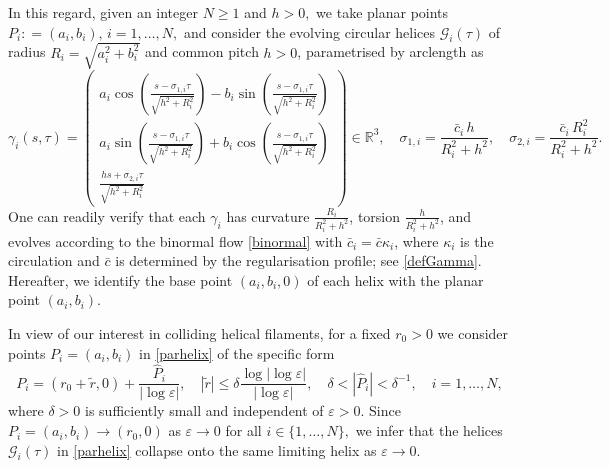 \documentclass[11pt,reqno,a4paper]{amsart}
\numberwithin{equation}{section}
\newcommand{\R}{\mathbb{R}}
\newcommand{\defeq}{\mathrel{\mathop:}=}
\newcommand{\ve}{\varepsilon}
\begin{document}
In this regard, given an integer $N\geq 1$ and $h>0,$ we take planar points $P_i\defeq(a_i,b_i),\,i=1,\dots,N,$ and consider the evolving circular helices  $\mathcal{G}_i(\tau)$ of radius $R_i=\sqrt{a_i^2+b_i^2}$ and common pitch $h>0$, parametrised by arclength as 
\begin{equation} \label{parhelix}
	\gamma_i(s,\tau ) = \left( \begin{matrix}
		a_i \cos \left(
		\frac{s-\sigma_{1,i} \tau}{\sqrt{h^2 + R_i^2}}\right)-b_i\sin \left(\frac{s-\sigma_{1,i}\tau}{\sqrt{h^2+R_i^2}} \right)
		\\
		a_i \sin \left(
		\frac{s-\sigma_{1,i} \tau}{\sqrt{h^2 + R_i^2}}\right)+b_i\cos \left(
		\frac{s-\sigma_{1,i} \tau}{\sqrt{h^2 + R_i^2}}\right)
		\\
		\frac{ h s + \sigma_{2,i} \tau }{\sqrt{h^2+ R_i^2}}
	\end{matrix} \right) \in \R^3, \quad \sigma_{1,i} = \frac{\bar{c}_i\,  h}{R_i^2 + h^2},
	\quad 
	\sigma_{2,i} = \frac{ \bar{c}_i\, R_i^2}{R_i^2 + h^2}.
	\end{equation}
One can readily verify that each $\gamma_i$ has curvature $\frac{R_i}{R_i^2+h^2}$, torsion $\frac{h}{R_i^2 + h^2}$, and evolves according to the binormal flow \eqref{binormal} with $\bar{c}_i=\bar{c}\kappa_i$, where $\kappa_i$ is the circulation and $\bar{c}$ is determined by the regularisation profile; see \eqref{defGamma}. Hereafter, we identify the base point  $(a_i,b_i,0)$ of each helix with the planar point $(a_i,b_i)$.

In view of our interest in  colliding helical filaments, for a fixed $r_0>0$ we consider points $P_i=(a_i,b_i)$ in \eqref{parhelix}  of the specific form 
\begin{equation}\label{formpoints}
P_i=(r_0+\tilde{r},0)+ \frac{\widehat{P}_i}{|\log\ve|}, \quad |\tilde{r}|\leq \delta \frac{\log|\log\ve|}{|\log\ve|}, \quad\delta<|\widehat{P}_i|<\delta^{-1}, \quad i=1,\dots,N,
\end{equation}
where $\delta>0$ is sufficiently small and independent of $\ve>0.$ Since $P_i=(a_i,b_i)\to (r_0,0)$ as $\ve\to 0$ for all $i\in\{1,\dots,N\},$ we infer that the helices $\mathcal{G}_i(\tau)$ in \eqref{parhelix} collapse onto the same limiting helix as $\ve \to 0.$ 
\end{document}
